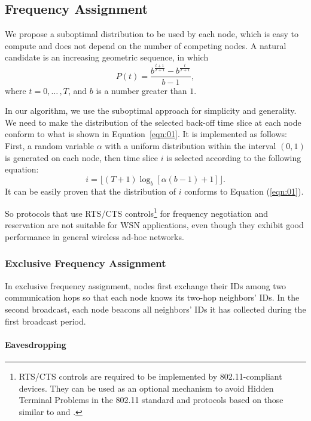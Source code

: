 \subsection{Frequency Assignment}

We propose a suboptimal distribution to be used by each node, which is
easy to compute and does not depend on the number of competing
nodes. A natural candidate is an increasing geometric sequence, in
which
\begin{equation}
\label{eqn:01}
P(t)=\frac{b^{\frac{t+1}{T+1}}-b^{\frac{t}{T+1}}}{b-1},
\end{equation}
where $t=0,{\ldots}\,,T$, and $b$ is a number greater than $1$.

In our algorithm, we use the suboptimal approach for simplicity and
generality. We need to make the distribution of the selected back-off
time slice at each node conform to what is shown in
Equation~\eqref{eqn:01}. It is implemented as follows: First, a random
variable $\alpha$ with a uniform distribution within the interval $(0,
1)$ is generated on each node, then time slice $i$ is selected
according to the following equation:
\[
i=\lfloor(T+1)\log_b[\alpha(b-1)+1]\rfloor.
\]
It can be easily proven that the distribution of $i$ conforms to Equation
(\ref{eqn:01}).

So protocols \cite{Tzamaloukas-01, Akyildiz-01, Adya-01, Bahl-02, Culler-01,Zhou-06} that use RTS/CTS
controls\footnote{RTS/CTS controls are required to be implemented by
802.11-compliant devices. They can be used as an optional mechanism
to avoid Hidden Terminal Problems in the 802.11 standard and
protocols based on those similar to \cite{Akyildiz-01} and
\cite{Adya-01}.} for frequency negotiation and reservation are not
suitable for WSN applications, even though they exhibit good
performance in general wireless ad-hoc
networks.

\subsubsection{Exclusive Frequency Assignment}


In exclusive frequency assignment, nodes first exchange their IDs
among two communication hops so that each node knows its two-hop
neighbors' IDs. In the second broadcast, each node beacons all
neighbors' IDs it has collected during the first broadcast period.

\paragraph{Eavesdropping}

